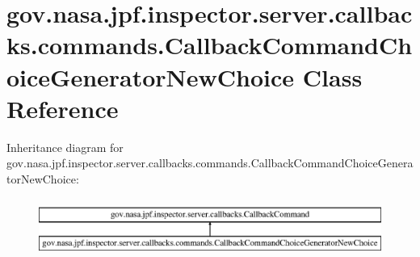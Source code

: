 \hypertarget{classgov_1_1nasa_1_1jpf_1_1inspector_1_1server_1_1callbacks_1_1commands_1_1_callback_command_choice_generator_new_choice}{}\section{gov.\+nasa.\+jpf.\+inspector.\+server.\+callbacks.\+commands.\+Callback\+Command\+Choice\+Generator\+New\+Choice Class Reference}
\label{classgov_1_1nasa_1_1jpf_1_1inspector_1_1server_1_1callbacks_1_1commands_1_1_callback_command_choice_generator_new_choice}
Inheritance diagram for gov.\+nasa.\+jpf.\+inspector.\+server.\+callbacks.\+commands.\+Callback\+Command\+Choice\+Generator\+New\+Choice\+:\begin{figure}[H]
\begin{center}
\leavevmode
\includegraphics[height=1.941074cm]{classgov_1_1nasa_1_1jpf_1_1inspector_1_1server_1_1callbacks_1_1commands_1_1_callback_command_choice_generator_new_choice}
\end{center}
\end{figure}
